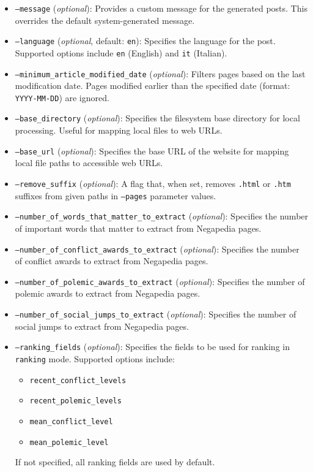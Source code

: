 \begin{itemize}
    \item \texttt{--message} (\textit{optional}): Provides a custom message for the generated posts. This overrides the default system-generated message.

    \item \texttt{--language} (\textit{optional}, default: \texttt{en}): Specifies the language for the post. Supported options include \texttt{en} (English) and \texttt{it} (Italian).

    \item \texttt{--minimum\_article\_modified\_date} (\textit{optional}): Filters pages based on the last modification date. Pages modified earlier than the specified date (format: \texttt{YYYY-MM-DD}) are ignored.

    \item \texttt{--base\_directory} (\textit{optional}): Specifies the filesystem base directory for local processing. Useful for mapping local files to web URLs.

    \item \texttt{--base\_url} (\textit{optional}): Specifies the base URL of the website for mapping local file paths to accessible web URLs.

    \item \texttt{--remove\_suffix} (\textit{optional}): A flag that, when set, removes \texttt{.html} or \texttt{.htm} suffixes from given paths in \texttt{--pages} parameter values.

    \item \texttt{--number\_of\_words\_that\_matter\_to\_extract} (\textit{optional}): Specifies the number of important words that matter to extract from Negapedia pages.

    \item \texttt{--number\_of\_conflict\_awards\_to\_extract} (\textit{optional}): Specifies the number of conflict awards to extract from Negapedia pages.

    \item \texttt{--number\_of\_polemic\_awards\_to\_extract} (\textit{optional}): Specifies the number of polemic awards to extract from Negapedia pages.

    \item \texttt{--number\_of\_social\_jumps\_to\_extract} (\textit{optional}): Specifies the number of social jumps to extract from Negapedia pages.

    \item \texttt{--ranking\_fields} (\textit{optional}): Specifies the fields to be used for ranking in \texttt{ranking} mode. Supported options include:
    \begin{itemize}
        \item \texttt{recent\_conflict\_levels}
        \item \texttt{recent\_polemic\_levels}
        \item \texttt{mean\_conflict\_level}
        \item \texttt{mean\_polemic\_level}
    \end{itemize}
    If not specified, all ranking fields are used by default.

\end{itemize}

